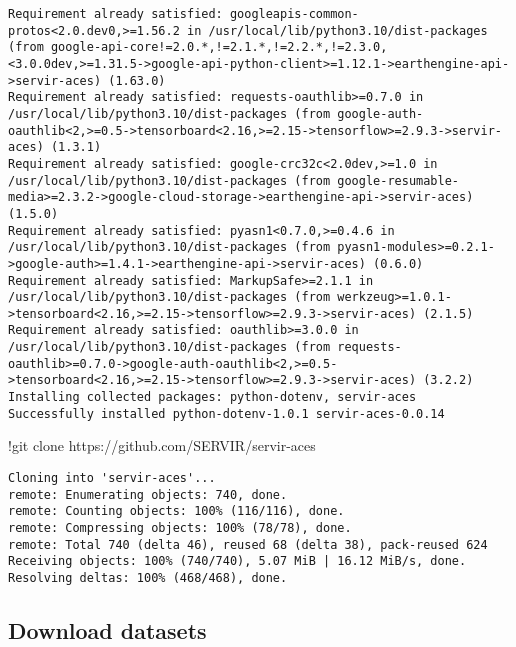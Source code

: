 \documentclass[
  letterpaper,
  DIV=11,
  numbers=noendperiod]{scrreprt}
\newenvironment{Shaded}{\begin{snugshade}}{\end{snugshade}}
\newcommand{\NormalTok}[1]{\textcolor[rgb]{0.00,0.23,0.31}{#1}}
\newcommand{\OperatorTok}[1]{\textcolor[rgb]{0.37,0.37,0.37}{#1}}
\begin{document}
\begin{verbatim}
Requirement already satisfied: googleapis-common-protos<2.0.dev0,>=1.56.2 in /usr/local/lib/python3.10/dist-packages (from google-api-core!=2.0.*,!=2.1.*,!=2.2.*,!=2.3.0,<3.0.0dev,>=1.31.5->google-api-python-client>=1.12.1->earthengine-api->servir-aces) (1.63.0)
Requirement already satisfied: requests-oauthlib>=0.7.0 in /usr/local/lib/python3.10/dist-packages (from google-auth-oauthlib<2,>=0.5->tensorboard<2.16,>=2.15->tensorflow>=2.9.3->servir-aces) (1.3.1)
Requirement already satisfied: google-crc32c<2.0dev,>=1.0 in /usr/local/lib/python3.10/dist-packages (from google-resumable-media>=2.3.2->google-cloud-storage->earthengine-api->servir-aces) (1.5.0)
Requirement already satisfied: pyasn1<0.7.0,>=0.4.6 in /usr/local/lib/python3.10/dist-packages (from pyasn1-modules>=0.2.1->google-auth>=1.4.1->earthengine-api->servir-aces) (0.6.0)
Requirement already satisfied: MarkupSafe>=2.1.1 in /usr/local/lib/python3.10/dist-packages (from werkzeug>=1.0.1->tensorboard<2.16,>=2.15->tensorflow>=2.9.3->servir-aces) (2.1.5)
Requirement already satisfied: oauthlib>=3.0.0 in /usr/local/lib/python3.10/dist-packages (from requests-oauthlib>=0.7.0->google-auth-oauthlib<2,>=0.5->tensorboard<2.16,>=2.15->tensorflow>=2.9.3->servir-aces) (3.2.2)
Installing collected packages: python-dotenv, servir-aces
Successfully installed python-dotenv-1.0.1 servir-aces-0.0.14
\end{verbatim}

\begin{Shaded}
\begin{Highlighting}[]
\OperatorTok{!}\NormalTok{git clone https:}\OperatorTok{//}\NormalTok{github.com}\OperatorTok{/}\NormalTok{SERVIR}\OperatorTok{/}\NormalTok{servir}\OperatorTok{{-}}\NormalTok{aces}
\end{Highlighting}
\end{Shaded}

\begin{verbatim}
Cloning into 'servir-aces'...
remote: Enumerating objects: 740, done.
remote: Counting objects: 100% (116/116), done.
remote: Compressing objects: 100% (78/78), done.
remote: Total 740 (delta 46), reused 68 (delta 38), pack-reused 624
Receiving objects: 100% (740/740), 5.07 MiB | 16.12 MiB/s, done.
Resolving deltas: 100% (468/468), done.
\end{verbatim}

\subsection{Download datasets}\label{download-datasets}
\end{document}
